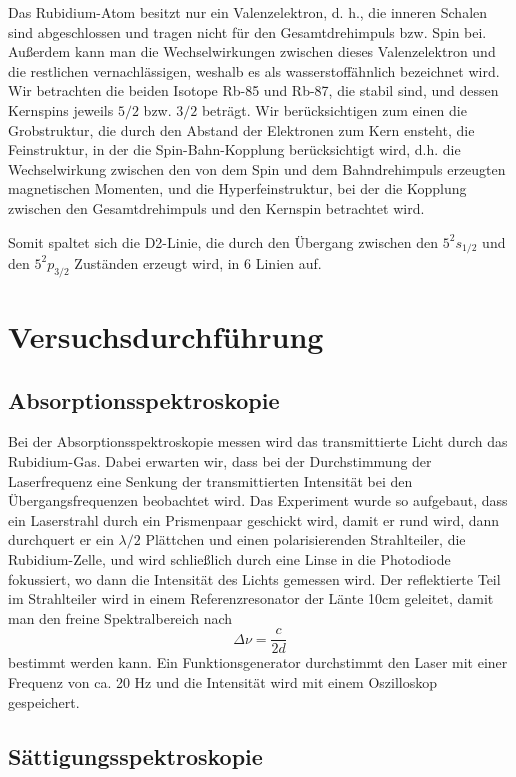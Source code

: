 \documentclass[a4paper,parskip]{scrartcl}
\begin{document}
Das Rubidium-Atom besitzt nur ein Valenzelektron, d. h., die inneren Schalen sind abgeschlossen und tragen nicht für den Gesamtdrehimpuls bzw. Spin bei. Außerdem kann man die Wechselwirkungen zwischen dieses Valenzelektron und die restlichen vernachlässigen, weshalb es als wasserstoffähnlich bezeichnet wird. Wir betrachten die beiden Isotope Rb-85 und Rb-87, die stabil sind, und dessen Kernspins jeweils $5/2$ bzw. $3/2$ beträgt. Wir berücksichtigen zum einen die Grobstruktur, die durch den Abstand der Elektronen zum Kern ensteht, die Feinstruktur, in der die Spin-Bahn-Kopplung berücksichtigt wird, d.h. die Wechselwirkung zwischen den von dem Spin und dem Bahndrehimpuls erzeugten magnetischen Momenten, und die Hyperfeinstruktur, bei der die Kopplung zwischen den Gesamtdrehimpuls und den Kernspin betrachtet wird.

Somit spaltet sich die D2-Linie, die durch den Übergang zwischen den $5^2s_{1/2}$ und den $5^2p_{3/2}$ Zuständen erzeugt wird, in 6 Linien auf.

\section{Versuchsdurchführung}

\subsection{Absorptionsspektroskopie}

 Bei der Absorptionsspektroskopie messen wird das transmittierte Licht durch das Rubidium-Gas. Dabei erwarten wir, dass bei der Durchstimmung der Laserfrequenz eine Senkung der transmittierten Intensität bei den Übergangsfrequenzen beobachtet wird. Das Experiment wurde so aufgebaut, dass ein Laserstrahl durch ein Prismenpaar geschickt wird, damit er rund wird, dann durchquert er ein $\lambda /2$ Plättchen und einen polarisierenden Strahlteiler, die Rubidium-Zelle, und wird schließlich durch eine Linse in die Photodiode fokussiert, wo dann die Intensität des Lichts gemessen wird. Der reflektierte Teil im Strahlteiler wird in einem Referenzresonator der Länte 10cm geleitet, damit man den freine Spektralbereich nach 
\begin{equation}
	\Delta \nu = \frac{c}{2d}
\end{equation}
bestimmt werden kann.
Ein Funktionsgenerator durchstimmt den Laser mit einer Frequenz von ca. 20 Hz und die Intensität wird mit einem Oszilloskop gespeichert.

\subsection{Sättigungsspektroskopie}
\end{document}
